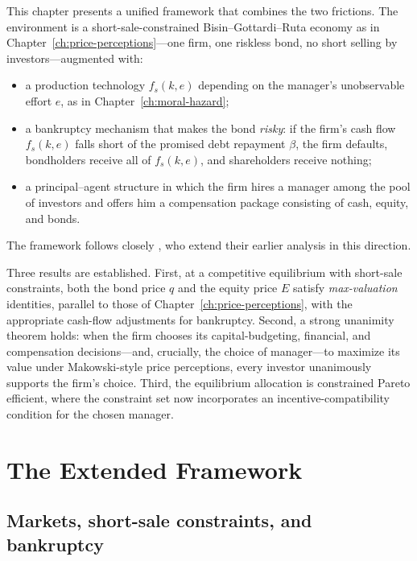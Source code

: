 \documentclass[11pt,a4paper,oneside]{book}
\theoremstyle{plain}
\theoremstyle{definition}
\theoremstyle{remark}
\numberwithin{equation}{chapter}
\begin{document}
This chapter presents a unified framework that combines the two frictions.
The environment is a short-sale-constrained Bisin--Gottardi--Ruta economy as in Chapter~\ref{ch:price-perceptions}---one firm, one riskless bond, no short selling by investors---augmented with:
\begin{itemize}
  \item a production technology $f_s(k, e)$ depending on the manager's unobservable effort $e$, as in Chapter~\ref{ch:moral-hazard};
  \item a bankruptcy mechanism that makes the bond \emph{risky}: if the firm's cash flow $f_s(k, e)$ falls short of the promised debt repayment $\beta$, the firm defaults, bondholders receive all of $f_s(k, e)$, and shareholders receive nothing;
  \item a principal--agent structure in which the firm hires a manager among the pool of investors and offers him a compensation package consisting of cash, equity, and bonds.
\end{itemize}
The framework follows closely \citet{BisinGottardiRuta2014}, who extend their earlier analysis in this direction.

Three results are established.
First, at a competitive equilibrium with short-sale constraints, both the bond price $q$ and the equity price $E$ satisfy \emph{max-valuation} identities, parallel to those of Chapter~\ref{ch:price-perceptions}, with the appropriate cash-flow adjustments for bankruptcy.
Second, a strong unanimity theorem holds: when the firm chooses its capital-budgeting, financial, and compensation decisions---and, crucially, the choice of manager---to maximize its value under Makowski-style price perceptions, every investor unanimously supports the firm's choice.
Third, the equilibrium allocation is constrained Pareto efficient, where the constraint set now incorporates an incentive-compatibility condition for the chosen manager.

\section{The Extended Framework}
\label{sec:MH-CPP-framework}

\subsection{Markets, short-sale constraints, and bankruptcy}
\end{document}
